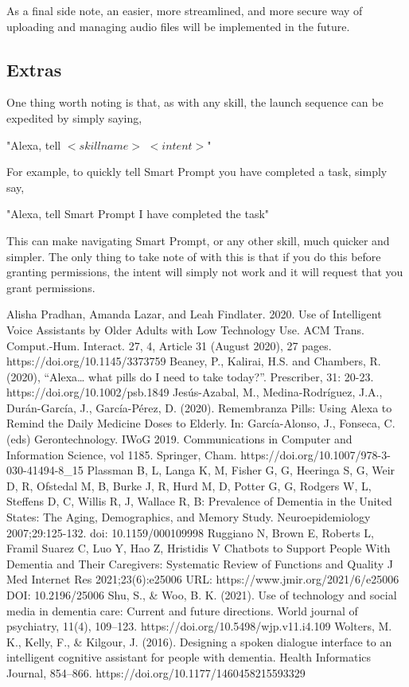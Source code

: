 \documentclass[11pt, oneside]{article}
\begin{document}
As a final side note, an easier, more streamlined, and more secure way of uploading and managing audio files will be implemented in the future.

\subsection{Extras}

One thing worth noting is that, as with any skill, the launch sequence can be expedited by simply saying,
\begin{center}
"Alexa, tell $<skill name>$ $<intent>$"
\end{center}
For example, to quickly tell Smart Prompt you have completed a task, simply say,
\begin{center}
"Alexa, tell Smart Prompt I have completed the task"
\end{center}
This can make navigating Smart Prompt, or any other skill, much quicker and simpler. The only thing to take note of with this is that if you do this before granting permissions, the intent will simply not work and it will request that you grant permissions.

\begin{thebibliography}{00}
 Alisha Pradhan, Amanda Lazar, and Leah Findlater. 2020. Use of Intelligent Voice Assistants by Older Adults with Low Technology Use. ACM Trans. Comput.-Hum. Interact. 27, 4, Article 31 (August 2020), 27 pages. https://doi.org/10.1145/3373759
 Beaney, P., Kalirai, H.S. and Chambers, R. (2020), “Alexa… what pills do I need to take today?”. Prescriber, 31: 20-23. https://doi.org/10.1002/psb.1849
 Jesús-Azabal, M., Medina-Rodríguez, J.A., Durán-García, J., García-Pérez, D. (2020). Remembranza Pills: Using Alexa to Remind the Daily Medicine Doses to Elderly. In: García-Alonso, J., Fonseca, C. (eds) Gerontechnology. IWoG 2019. Communications in Computer and Information Science, vol 1185. Springer, Cham. https://doi.org/10.1007/978-3-030-41494-8\_15
 Plassman B, L, Langa K, M, Fisher G, G, Heeringa S, G, Weir D, R, Ofstedal M, B, Burke J, R, Hurd M, D, Potter G, G, Rodgers W, L, Steffens D, C, Willis R, J, Wallace R, B: Prevalence of Dementia in the United States: The Aging, Demographics, and Memory Study. Neuroepidemiology 2007;29:125-132. doi: 10.1159/000109998
 Ruggiano N, Brown E, Roberts L, Framil Suarez C, Luo Y, Hao Z, Hristidis V
Chatbots to Support People With Dementia and Their Caregivers: Systematic Review of Functions and Quality
J Med Internet Res 2021;23(6):e25006
URL: https://www.jmir.org/2021/6/e25006
DOI: 10.2196/25006
 Shu, S., \& Woo, B. K. (2021). Use of technology and social media in dementia care: Current and future directions. World journal of psychiatry, 11(4), 109–123. https://doi.org/10.5498/wjp.v11.i4.109
 Wolters, M. K., Kelly, F., \& Kilgour, J. (2016). Designing a spoken dialogue interface to an intelligent cognitive assistant for people with dementia. Health Informatics Journal, 854–866. https://doi.org/10.1177/1460458215593329
\end{thebibliography}
\end{document}
